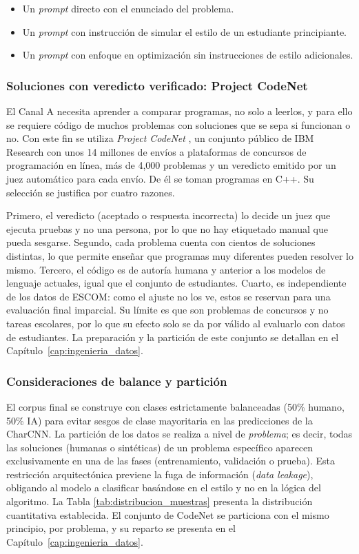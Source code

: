 \begin{itemize}
	\item Un \textit{prompt} directo con el enunciado del problema.
	\item Un \textit{prompt} con instrucción de simular el estilo de un estudiante principiante.
	\item Un \textit{prompt} con enfoque en optimización sin instrucciones de estilo adicionales.
\end{itemize}

\subsubsection{Soluciones con veredicto verificado: Project CodeNet}

El Canal A necesita aprender a comparar programas, no solo a leerlos, y para ello se requiere código de muchos problemas con soluciones que se sepa si funcionan o no. Con este fin se utiliza \textit{Project CodeNet} \cite{Puri2021CodeNet}, un conjunto público de IBM Research con unos 14 millones de envíos a plataformas de concursos de programación en línea, más de 4,000 problemas y un veredicto emitido por un juez automático para cada envío. De él se toman programas en C++. Su selección se justifica por cuatro razones.

Primero, el veredicto (aceptado o respuesta incorrecta) lo decide un juez que ejecuta pruebas y no una persona, por lo que no hay etiquetado manual que pueda sesgarse. Segundo, cada problema cuenta con cientos de soluciones distintas, lo que permite enseñar que programas muy diferentes pueden resolver lo mismo. Tercero, el código es de autoría humana y anterior a los modelos de lenguaje actuales, igual que el conjunto de estudiantes. Cuarto, es independiente de los datos de ESCOM: como el ajuste no los ve, estos se reservan para una evaluación final imparcial. Su límite es que son problemas de concursos y no tareas escolares, por lo que su efecto solo se da por válido al evaluarlo con datos de estudiantes. La preparación y la partición de este conjunto se detallan en el Capítulo~\ref{cap:ingenieria_datos}.

\subsubsection{Consideraciones de balance y partición}

El corpus final se construye con clases estrictamente balanceadas (50\% humano, 50\% IA) para evitar sesgos de clase mayoritaria en las predicciones de la CharCNN. La partición de los datos se realiza a nivel de \textit{problema}; es decir, todas las soluciones (humanas o sintéticas) de un problema específico aparecen exclusivamente en una de las fases (entrenamiento, validación o prueba). Esta restricción arquitectónica previene la fuga de información (\textit{data leakage}), obligando al modelo a clasificar basándose en el estilo y no en la lógica del algoritmo. La Tabla \ref{tab:distribucion_muestras} presenta la distribución cuantitativa establecida. El conjunto de CodeNet se particiona con el mismo principio, por problema, y su reparto se presenta en el Capítulo~\ref{cap:ingenieria_datos}.

